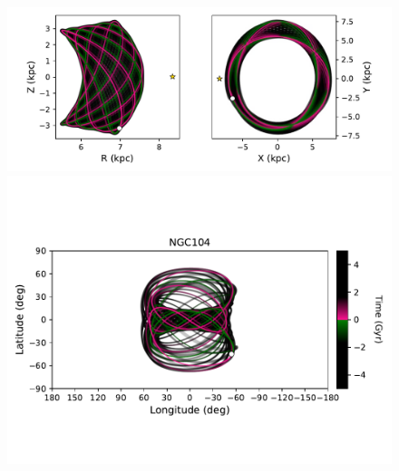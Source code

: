             \twocolumn
            \begin{figure}
                \begin{center}
                    \includegraphics[clip=true, trim = 0mm 2mm 0mm 0mm, width=\columnwidth]{images/PII_individual_NGC104_NGC104orbitRZXY.pdf}
                    \includegraphics[clip=true, trim = 0mm 20mm 0mm 10mm, width=\columnwidth]{images/PII_individual_NGC104_NGC104orbit.pdf}


\end{center}
\end{figure}
